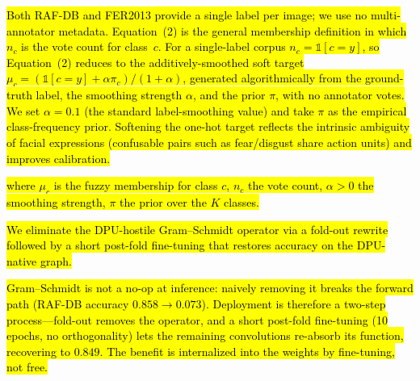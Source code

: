 
\usepackage{soul}
\usepackage{xcolor}
\usepackage{amssymb}
\newcommand{\rev}[1]{\hl{#1}}          %


\rev{Both RAF-DB and FER2013 provide a single label per image; we use no
multi-annotator metadata. Equation~(2) is the general membership definition in
which \mbox{$n_c$} is the vote count for class~\mbox{$c$}. For a single-label
corpus \mbox{$n_c=\mathbb{1}[c=y]$}, so Equation~(2) reduces to the
additively-smoothed soft target \mbox{$\mu_c=(\mathbb{1}[c=y]+\alpha\pi_c)/(1+\alpha)$},
generated algorithmically from the ground-truth label, the smoothing strength
\mbox{$\alpha$}, and the prior \mbox{$\pi$}, with no annotator votes. We set
\mbox{$\alpha=0.1$} (the standard label-smoothing value) and take \mbox{$\pi$} as
the empirical class-frequency prior. Softening the one-hot target reflects the
intrinsic ambiguity of facial expressions (confusable pairs such as fear/disgust
share action units) and improves calibration.}


\rev{where \mbox{$\mu_c$} is the fuzzy membership for class \mbox{$c$},
\mbox{$n_c$} the vote count, \mbox{$\alpha>0$} the smoothing strength,
\mbox{$\pi$} the prior over the \mbox{$K$} classes.}


\rev{We eliminate the DPU-hostile Gram--Schmidt operator via a fold-out rewrite
followed by a short post-fold fine-tuning that restores accuracy on the
DPU-native graph.}

\rev{Gram--Schmidt is not a no-op at inference: naively removing it breaks the
forward path (RAF-DB accuracy \mbox{$0.858\!\to\!0.073$}). Deployment is therefore
a two-step process---fold-out removes the operator, and a short post-fold
fine-tuning (10 epochs, no orthogonality) lets the remaining convolutions
re-absorb its function, recovering to \mbox{$0.849$}. The benefit is internalized
into the weights by fine-tuning, not free.}


